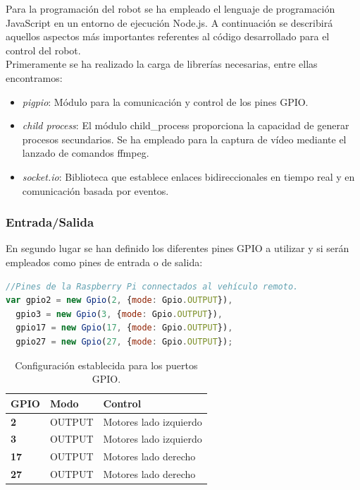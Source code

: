 Para la programación del robot se ha empleado el lenguaje de programación JavaScript en un entorno de ejecución Node.js. A continuación se describirá aquellos aspectos más importantes referentes al código
desarrollado para el control del robot.\\

Primeramente se ha realizado la carga de librerías necesarias, entre ellas encontramos:

\begin{itemize}
 \item \emph{pigpio}: Módulo para la comunicación y control de los pines GPIO.
 \item \emph{child process}: El módulo child\_process proporciona la capacidad de generar procesos secundarios. Se ha empleado para la captura de vídeo mediante el lanzado de comandos ffmpeg.
 \item \emph{socket.io}: Biblioteca que establece enlaces bidireccionales en tiempo real y en comunicación basada por eventos.
\end{itemize}


\subsubsection{Entrada/Salida}

En segundo lugar se han definido los diferentes pines GPIO a utilizar y si serán empleados como pines de entrada o de salida:

\begin{lstlisting}[language=JavaScript]
//Pines de la Raspberry Pi connectados al vehículo remoto.
var gpio2 = new Gpio(2, {mode: Gpio.OUTPUT}),
  gpio3 = new Gpio(3, {mode: Gpio.OUTPUT}),
  gpio17 = new Gpio(17, {mode: Gpio.OUTPUT}),
  gpio27 = new Gpio(27, {mode: Gpio.OUTPUT});
\end{lstlisting}


\begin{table}[H]
  \begin{center}
    \begin{tabular}{|p{2.5cm}|p{2.5cm}|p{4.5cm}|}
      \hline
      {\textbf{GPIO}} & \textbf{ Modo } & \textbf{ Control }\\
      \hline
      {\textbf{ 2 }} & { OUTPUT } & { Motores lado izquierdo }  \\
     \hline
      {\textbf{ 3 }} & { OUTPUT } & { Motores lado izquierdo } \\
      \hline
      {\textbf{ 17 }} & { OUTPUT } & {  Motores lado derecho } \\
      \hline
      {\textbf{ 27 }} & { OUTPUT } & { Motores lado derecho } \\
     \hline   
    \end{tabular}
  \end{center}
\caption{ Configuración establecida para los puertos GPIO. }
\end{table}


